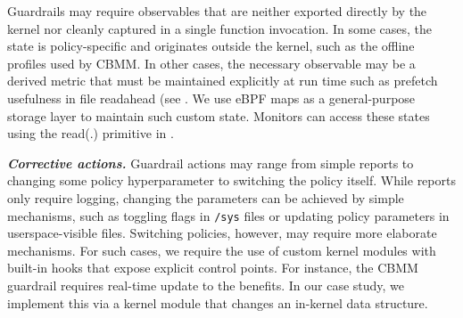 Guardrails may require observables that are neither exported directly by the kernel nor cleanly captured in a single function invocation.
In some cases, the state is policy-specific and originates outside the kernel, such as the offline profiles used by CBMM.
In other cases, the necessary observable may be a derived metric that must be maintained explicitly at run time such as prefetch usefulness in file readahead (see . 
We use eBPF maps as a general-purpose storage layer to maintain such custom state.
Monitors can access these states using the {\sf read(.)} primitive in .

\medskip\noindent
{\it \textbf{Corrective actions.}}
Guardrail actions may range from simple reports to changing some policy hyperparameter to switching the policy itself. While reports only require logging, changing the parameters can be achieved by simple mechanisms, such as toggling flags in {\tt /sys} files or updating policy parameters in userspace-visible files.
Switching policies, however, may require more elaborate mechanisms. For such cases, we require the use of custom kernel modules with built-in hooks that expose explicit control points. For instance, the CBMM guardrail requires real-time update to the benefits. In our case study, we implement this via a kernel module that changes an in-kernel data structure.

